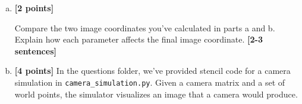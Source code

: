 \begin{enumerate}[(a)]
\begin{enumerate} [(i)]
\begin{tcolorbox}[colback=white!5!white,colframe=green!75!black]
{{    %
    }}
\end{tcolorbox}

\end{enumerate}
\item \textbf{[2 points]}

\begin{tcolorbox}[colback=orange!5!white,colframe=orange!75!black]
Compare the two image coordinates you've calculated in parts a and b. Explain how each parameter affects the final image coordinate. \textbf{[2-3 sentences]}
\end{tcolorbox}











\pagebreak
\item \textbf{[4 points]}
In the questions folder, we've provided stencil code for a camera simulation in \texttt{camera\_simulation.py}. Given a camera matrix and a set of world points, the simulator visualizes an image that a camera would produce. 


\end{enumerate}
